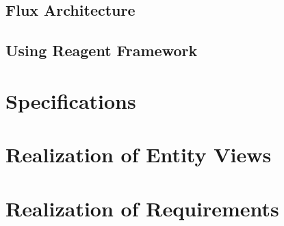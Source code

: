\subsection{Flux Architecture}

\cite{Flux2016}
\subsection{Using Reagent Framework}
 
\cite{Reframe2016}



\section{Specifications}



\section{Realization of Entity Views}


\section{Realization of Requirements}
